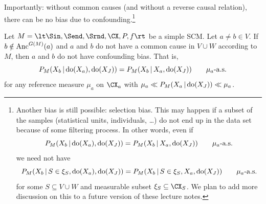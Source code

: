 Importantly: without common causes (and without a reverse causal relation), there can be no bias due to confounding.\footnote{Another bias is still possible: selection bias. This may happen if a subset of the samples (statistical units, individuals, \dots) do not end up in the data set because of some filtering process. 
In other words, even if
  $$P_{M}(X_b \operatorname*{|} \operatorname{do}(X_a), \operatorname{do}(X_J)) = P_{M}(X_b \operatorname*{|} X_a, \operatorname{do}(X_J)) \qquad \mu_a\text{-a.s.}$$
we need not have
  $$P_{M}(X_b \operatorname*{|} S \in \xi_S, \operatorname{do}(X_a), \operatorname{do}(X_J)) = P_{M}(X_b \operatorname*{|} S \in \xi_S, X_a, \operatorname{do}(X_J)) \qquad \mu_a\text{-a.s.}$$
for some $S \subseteq V \cup W$ and measurable subset $\xi_S \subseteq \CX_S$.
We plan to add more discussion on this to a future version of these lecture notes.}
\begin{Prp}\label{prp:scm_confounded_separation}
Let $M = \lt \Sin, \Send, \Srnd, \CX, P, f \rt$ be a simple SCM.
Let $a \ne b \in V$.
If $b \notin \mathrm{Anc}^{G(M)}(a)$ and $a$ and $b$ do not have a common cause in $V \cup W$ according to $M$, then
$a$ and $b$ do not have confounding bias. That is,
  $$P_{M}(X_b \operatorname*{|} \operatorname{do}(X_a), \operatorname{do}(X_J)) = P_{M}(X_b \operatorname*{|} X_a, \operatorname{do}(X_J)) \qquad \mu_a\text{-a.s.}$$
for any reference measure $\mu_a$ on $\CX_a$ with $\mu_a \ll P_M(X_a \operatorname*{|} \operatorname{do}(X_J)) \ll \mu_a$.
\end{Prp}
